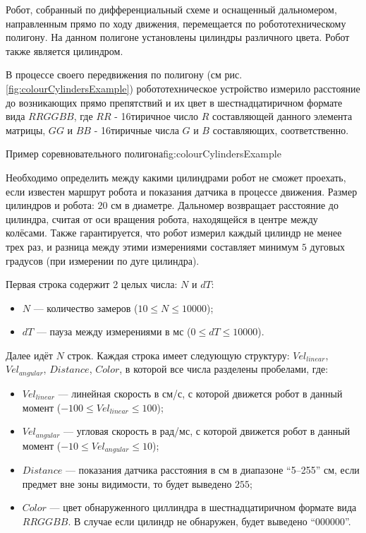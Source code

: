 

Робот, собранный по дифференциальный схеме и оснащенный дальномером, направленным прямо по ходу движения,
перемещается по робототехническому полигону.
На данном полигоне установлены цилиндры различного цвета. Робот также является цилиндром.

В процессе своего передвижения по полигону (см рис. \ref{fig:colourCylindersExample})
робототехническое устройство измерило расстояние до возникающих прямо препятствий
и их цвет в шестнадцатиричном формате вида $RRGGBB$, где $RR$ - 16тиричное число $R$ составляющей данного элемента
матрицы, $GG$ и $BB$ - 16тиричные числа $G$ и $B$ составляющих, соответственно.

{Пример соревновательного полигона}{fig:colourCylindersExample}

Необходимо определить между какими цилиндрами робот не сможет проехать, если известен маршрут робота и показания
датчика в процессе движения.
Размер цилиндров и робота: $20$ см в диаметре.
Дальномер возвращает расстояние до цилиндра, считая от оси вращения робота,
находящейся в центре между колёсами.
Также гарантируется, что робот измерил каждый цилиндр не менее трех раз, и разница между этими измерениями составляет
минимум $5$ дуговых градусов (при измерении по дуге цилиндра).


Первая строка содержит 2 целых числа: $N$ и $dT$:
\begin{itemize}
    \item $N$ --- количество замеров ($10 \leq N \leq 10000$);
    \item $dT$ --- пауза между измерениями в мс ($0 \leq dT \leq 10000$).
\end{itemize}

Далее идёт $N$ строк. Каждая строка имеет следующую структуру:
$Vel_{linear}$, $Vel_{angular}$, $Distance$, $Color$, в которой все числа разделены пробелами, где:
\begin{itemize}
    \item $Vel_{linear}$ --- линейная скорость в см/с, с которой движется робот в данный момент ($-100 \leq Vel_{linear} \leq 100$);
    \item $Vel_{angular}$ --- угловая скорость в рад/мс, с которой движется робот в данный момент ($-10 \leq Vel_{angular} \leq 10$);
    \item $Distance$ --- показания датчика расстояния в см в диапазоне ``5--255'' см, если предмет вне зоны видимости, то
    будет выведено $255$;
    \item $Color$ --- цвет обнаруженного циллиндра в шестнадцатиричном формате вида $RRGGBB$.
    В случае если цилиндр не обнаружен, будет выведено ``000000''.
\end{itemize}


